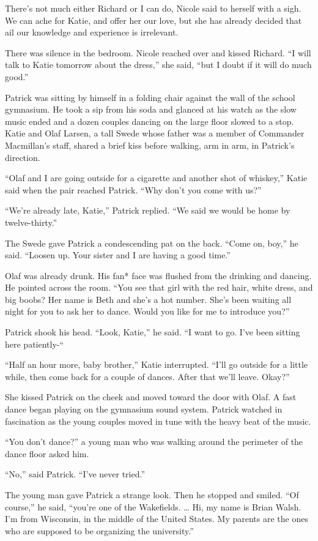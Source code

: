 \documentclass[]{article}
\begin{document}
{There’s not much either Richard or I can do, Nicole said to herself with a sigh. We can ache for Katie, and offer her our love, but she has already decided that ail our knowledge and experience is irrelevant.

There was silence in the bedroom. Nicole reached over and kissed Richard. “I will talk to Katie tomorrow about the dress,” she said, “but I doubt if it will do much good.”

Patrick was sitting by himself in a folding chair against the wall of the school gymnasium. He took a sip from his soda and glanced at his watch as the slow music ended and a dozen couples dancing on the large floor slowed to a stop. Katie and Olaf Larsen, a tall Swede whose father was a member of Commander Macmillan’s staff, shared a brief kiss before walking, arm in arm, in Patrick’s direction.

“Olaf and I are going outside for a cigarette and another shot of whiskey,” Katie said when the pair reached Patrick. “Why don’t you come with us?”

“We’re already late, Katie,” Patrick replied. “We said we would be home by twelve-thirty.”

The Swede gave Patrick a condescending pat on the back. “Come on, boy,” he said. “Loosen up. Your sister and I are having a good time.”

Olaf was already drunk. His fan* face was flushed from the drinking and dancing. He pointed across the room. “You see that girl with the red hair, white dress, and big boobs? Her name is Beth and she’s a hot number. She’s been waiting all night for you to ask her to dance. Would you like for me to introduce you?”

Patrick shook his head. “Look, Katie,” he said. “I want to go. I’ve been sitting here patiently-“

“Half an hour more, baby brother,” Katie interrupted. “I’ll go outside for a little while, then come back for a couple of dances. After that we’ll leave. Okay?”

She kissed Patrick on the cheek and moved toward the door with Olaf. A fast dance began playing on the gymnasium sound system. Patrick watched in fascination as the young couples moved in tune with the heavy beat of the music.

“You don’t dance?” a young man who was walking around the perimeter of the dance floor asked him.

“No,” said Patrick. “I’ve never tried.”

The young man gave Patrick a strange look. Then he stopped and smiled. “Of course,” he said, “you’re one of the Wakefields. … Hi, my name is Brian Walsh. I’m from Wisconsin, in the middle of the United States. My parents are the ones who are supposed to be organizing the university.”

}
\end{document}
